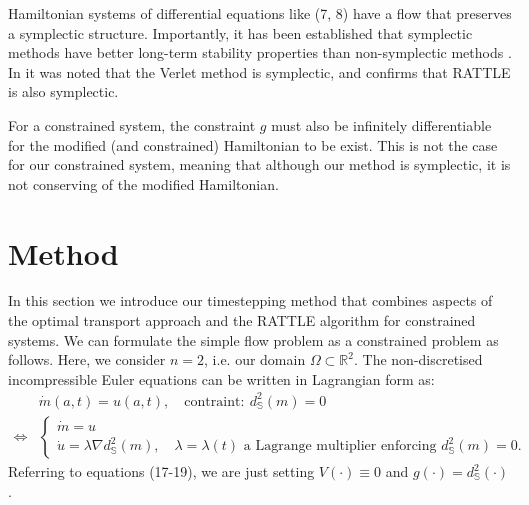 \documentclass[11pt, oneside]{article}   	%
\newcommand{\R}{\mathbb{R}}
\newcommand{\dsmsq}{d^{2}_{\mathbb{S}}(m)}
\newcommand{\graddsmsq}{\nabla{d^{2}_{\mathbb{S}}(m)}}
\newcommand{\Sb}{\mathbb{S}}
\begin{document}
Hamiltonian systems of differential equations like (7, 8) have a flow that preserves a symplectic structure. Importantly, it has been established that symplectic methods have better long-term stability properties than non-symplectic methods \citep{okunbor1992explicit}. In \cite{ruth1983canonical} it was noted that the Verlet method is symplectic, and \cite{leimkuhler1994symplectic} confirms that RATTLE is also symplectic. 

For a constrained system, the constraint \(g\) must also be infinitely differentiable for the modified (and constrained) Hamiltonian to be exist. This is not the case for our constrained system, meaning that although our method is symplectic, it is not conserving of the modified Hamiltonian.


\section{Method}

In this section we introduce our timestepping method that combines aspects of the optimal transport approach and the RATTLE algorithm for constrained systems. We can formulate the simple flow problem as a constrained problem as follows. Here, we consider \(n=2\), i.e. our domain \(\Omega \subset \R^2\). The non-discretised incompressible Euler equations can be written in Lagrangian form as:
\begin{align}
& \dot{m}(a, t) = u(a,t), \quad \text{contraint}: \: \dsmsq = 0 \\
\iff
 &\begin{cases}
  \dot{m} = u \\
  \dot{u} = \lambda \graddsmsq, \quad \lambda = \lambda(t) \text{ a Lagrange multiplier enforcing } \dsmsq = 0.
 \end{cases} 
\end{align}
Referring to equations (17-19), we are just setting \(V(\cdot) \equiv 0\) and \(g(\cdot) = d^2_{\Sb}(\cdot)\).
\end{document}
